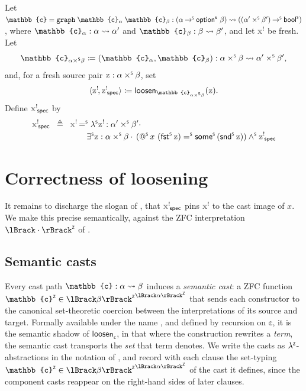 \begin{definition}
Let $\mathbb{c} = \mathtt{graph}\;\mathbb{c}_\alpha\;\mathbb{c}_\beta : \castpath{(\alpha \toS \optS\,\beta)}{((\alpha' \timesS \beta') \toS \boolS)}$, where $\mathbb{c}_\alpha : \castpath{\alpha}{\alpha'}$ and $\mathbb{c}_\beta : \castpath{\beta}{\beta'}$, and let $\lvar{x}$ be fresh. Let
\[
  \mathbb{c}_{\alpha \timesS \beta} \coloneq (\mathbb{c}_\alpha,\mathbb{c}_\beta)
  : \castpath{\alpha \timesS \beta}{\alpha' \timesS \beta'},
\]
and, for a fresh source pair $\var{z}:\alpha \timesS \beta$, set
\[
  \langle \lvar{z}, \spec{\lvar{z}} \rangle
  \coloneq \mathsf{loosen}_{\mathbb{c}_{\alpha \timesS \beta}}(\var{z}).
\]
Define $\spec{\lvar{x}}$ by
  \vspace{-.5\baselineskip}
\begin{align*}
\spec{\lvar{x}} \;\;\triangleq\;\; {} & \lvar{x} \eqS \lamS \lvar{z} : \alpha' \timesS \beta' \cdot\\
&\qquad \existsS \var{z} : \alpha \timesS \beta\cdot\, (\appS x (\fstS \var{z}) \eqS \someS(\sndS \var{z})) \andS \spec{\lvar{z}}
\end{align*}
\end{definition}

\section{Correctness of loosening}
\label{sec:loosening-correctness}

It remains to discharge the slogan of , that $\spec{\lvar{x}}$ pins $\lvar{x}$ to the cast image of $x$. We make this precise semantically, against the ZFC interpretation $\interpZ{\cdot}$ of .

\subsection{Semantic casts}
\label{subsec:semantic-casts}
Every cast path $\mathbb{c} : \castpath{\alpha}{\beta}$ induces a \emph{semantic cast}: a ZFC function $\zop{\mathbb{c}} \in {\interpZ{\beta}}^{\interpZ{\alpha}}$ that sends each constructor to the canonical set-theoretic coercion between the interpretations of its source and target. Formally available under the name {\small{}}, and defined by recursion on $\mathbb{c}$, it is the semantic shadow of $\mathsf{loosen}_{\mathbb{c}}$, in that where the construction rewrites a \emph{term}, the semantic cast transports the \emph{set} that term denotes. We write the casts as $\lambda^{\scriptscriptstyle{\mathsf{Z}}}$-abstractions in the notation of , and record with each clause the set-typing $\zop{\mathbb{c}} \in {\interpZ{\beta}}^{\interpZ{\alpha}}$ of the cast it defines, since the component casts reappear on the right-hand sides of later clauses.


